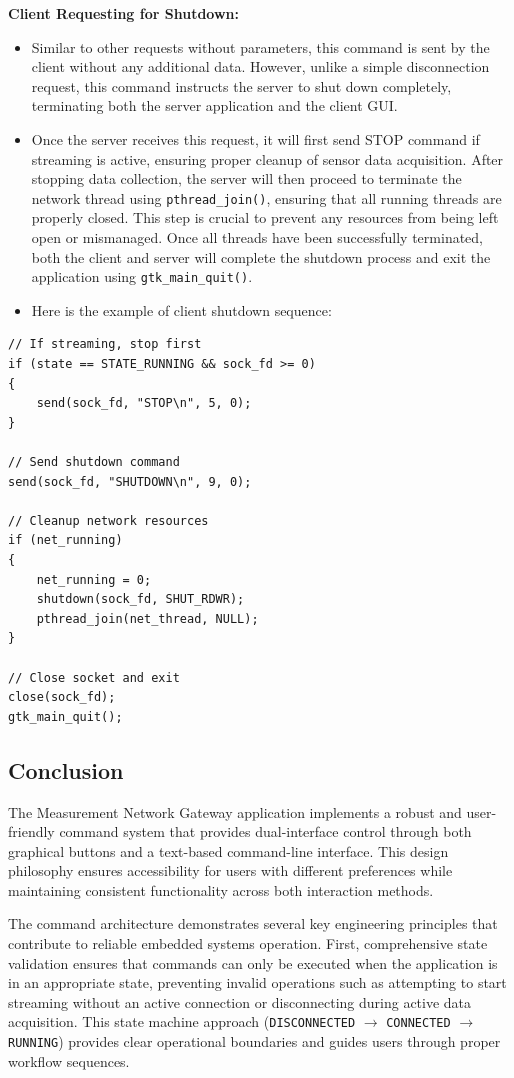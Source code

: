 \textbf{Client Requesting for Shutdown:}
\begin{itemize}
\item Similar to other requests without parameters, this command is sent by the client without any additional data. However, unlike a simple disconnection request, this command instructs the server to shut down completely, terminating both the server application and the client GUI.
\item Once the server receives this request, it will first send STOP command if streaming is active, ensuring proper cleanup of sensor data acquisition. After stopping data collection, the server will then proceed to terminate the network thread using \texttt{pthread\_join()}, ensuring that all running threads are properly closed. This step is crucial to prevent any resources from being left open or mismanaged. Once all threads have been successfully terminated, both the client and server will complete the shutdown process and exit the application using \texttt{gtk\_main\_quit()}.
\item Here is the example of client shutdown sequence:
\end{itemize}
\begin{verbatim}
// If streaming, stop first
if (state == STATE_RUNNING && sock_fd >= 0)
{
    send(sock_fd, "STOP\n", 5, 0);
}

// Send shutdown command
send(sock_fd, "SHUTDOWN\n", 9, 0);

// Cleanup network resources
if (net_running)
{
    net_running = 0;
    shutdown(sock_fd, SHUT_RDWR);
    pthread_join(net_thread, NULL);
}

// Close socket and exit
close(sock_fd);
gtk_main_quit();
\end{verbatim}

\subsection{Conclusion}
The Measurement Network Gateway application implements a robust and user-friendly command system that provides dual-interface control through both graphical buttons and a text-based command-line interface. This design philosophy ensures accessibility for users with different preferences while maintaining consistent functionality across both interaction methods.

The command architecture demonstrates several key engineering principles that contribute to reliable embedded systems operation. First, comprehensive state validation ensures that commands can only be executed when the application is in an appropriate state, preventing invalid operations such as attempting to start streaming without an active connection or disconnecting during active data acquisition. This state machine approach (\texttt{DISCONNECTED} $\rightarrow$ \texttt{CONNECTED} $\rightarrow$ \texttt{RUNNING}) provides clear operational boundaries and guides users through proper workflow sequences.

